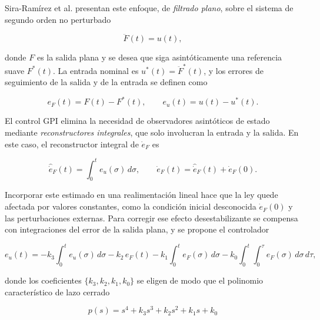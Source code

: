 Sira-Ramírez et al. \cite[sec.~3.4.3]{sira2017adrc} presentan este enfoque, de
\emph{filtrado plano}, sobre el sistema de segundo orden no perturbado

\begin{equation}
    \ddot{F}(t) = u(t) ,
    \label{eq:sira_planta}
\end{equation}

donde $F$ es la salida plana y se desea que siga asintóticamente una
referencia suave $F^{*}(t)$. La entrada nominal es
$u^{*}(t) = \ddot{F}^{*}(t)$, y los errores de seguimiento de la salida y de
la entrada se definen como

\begin{equation}
    e_F(t) = F(t) - F^{*}(t), \qquad e_u(t) = u(t) - u^{*}(t).
    \label{eq:sira_errores}
\end{equation}

El control GPI elimina la necesidad de observadores asintóticos de estado
mediante \emph{reconstructores integrales}, que solo involucran la entrada y
la salida. En este caso, el reconstructor integral de $\dot{e}_F$ es

\begin{equation}
    \hat{\dot{e}}_F(t) = \int_0^t e_u(\sigma)\,d\sigma,
    \qquad
    \dot{e}_F(t) = \hat{\dot{e}}_F(t) + \dot{e}_F(0).
    \label{eq:sira_reconstructor}
\end{equation}

Incorporar este estimado en una realimentación lineal hace que la ley quede
afectada por valores constantes, como la condición inicial desconocida
$\dot{e}_F(0)$ y las perturbaciones externas. Para corregir ese efecto
desestabilizante se compensa con integraciones del error de la salida plana, y
se propone el controlador

\begin{equation}
    e_u(t) = -k_3\!\int_0^t\! e_u(\sigma)\,d\sigma
          - k_2\, e_F(t)
          - k_1\!\int_0^t\! e_F(\sigma)\,d\sigma
          - k_0\!\int_0^t\!\!\int_0^{\tau}\! e_F(\sigma)\,d\sigma\,d\tau ,
    \label{eq:sira_gpi}
\end{equation}

donde los coeficientes $\{k_3,k_2,k_1,k_0\}$ se eligen de modo que el
polinomio característico de lazo cerrado

\begin{equation}
    p(s) = s^{4} + k_3 s^{3} + k_2 s^{2} + k_1 s + k_0
    \label{eq:sira_polinomio}
\end{equation}

